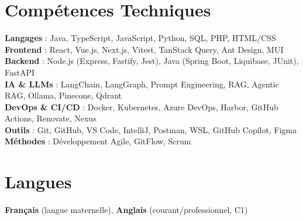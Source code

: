 \documentclass[letterpaper,11pt]{article}
\begin{document}
\section{Compétences Techniques}
    \begin{itemize}[leftmargin=0.15in, label={}]
        \small{\item{
            \textbf{Langages} : Java, TypeScript, JavaScript, Python, SQL, PHP, HTML/CSS \\
            \textbf{Frontend} : React, Vue.js, Next.js, Vitest, TanStack Query, Ant Design, MUI \\
            \textbf{Backend} : Node.js (Express, Fastify, Jest), Java (Spring Boot, Liquibase, JUnit), FastAPI \\
            \textbf{IA \& LLMs} : LangChain, LangGraph, Prompt Engineering, RAG, Agentic RAG, Ollama, Pinecone, Qdrant \\
            \textbf{DevOps \& CI/CD} : Docker, Kubernetes, Azure DevOps, Harbor, GitHub Actions, Renovate, Nexus \\
            \textbf{Outils} : Git, GitHub, VS Code, IntelliJ, Postman, WSL, GitHub Copilot, Figma \\
            \textbf{Méthodes} : Développement Agile, GitFlow, Scrum
        }}
    \end{itemize}

\section{Langues}
    \textbf{Français} (langue maternelle), \textbf{Anglais} (courant/professionnel, C1)

\end{document}
